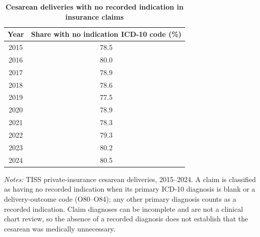 \begin{table}[H]\centering
\caption{\textbf{Cesarean deliveries with no recorded indication in insurance claims}}
\label{tab:no_indication}\small
\begin{tabular}{cc}
\toprule
Year & Share with no indication ICD-10 code (\%) \\
\midrule
2015 & 78.5 \\
2016 & 80.0 \\
2017 & 78.9 \\
2018 & 78.6 \\
2019 & 77.5 \\
2020 & 78.9 \\
2021 & 78.3 \\
2022 & 79.3 \\
2023 & 80.2 \\
2024 & 80.5 \\
\bottomrule
\end{tabular}
\begin{minipage}{\linewidth}\footnotesize
\textit{Notes:} TISS private-insurance cesarean deliveries, 2015--2024. A claim is classified as having no recorded indication when its primary ICD-10 diagnosis is blank or a delivery-outcome code (O80--O84); any other primary diagnosis counts as a recorded indication. Claim diagnoses can be incomplete and are not a clinical chart review, so the absence of a recorded diagnosis does not establish that the cesarean was medically unnecessary.
\end{minipage}
\end{table}
